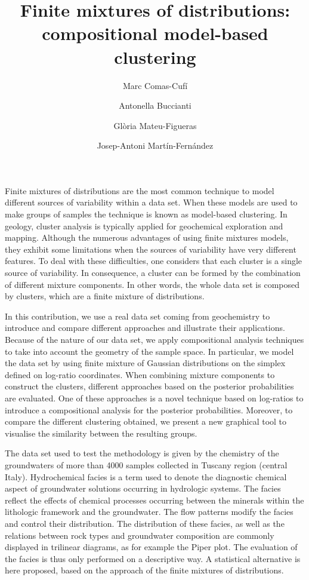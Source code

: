 \documentclass[a4paper,11pt]{article}
\title{Finite mixtures of distributions: compositional model-based clustering}
\author{Marc Comas-Cufí \and Antonella Buccianti \and Glòria Mateu-Figueras \and Josep-Antoni Martín-Fernández}
\begin{document}
\maketitle

Finite mixtures of distributions are the most common technique to model different sources of variability within a data set. When these models are used to make groups of samples the technique is known as  model-based clustering. In geology, cluster analysis is typically applied for geochemical exploration and mapping. Although the numerous advantages of using finite mixtures models, they exhibit some limitations when the sources of variability have very different features. To deal with these difficulties, one considers that each cluster is a single source of variability. In consequence, a cluster can be formed by the combination of different mixture components. In other words, the whole data set is composed by clusters, which are a finite mixture of distributions.

In this contribution, we use a real data set coming from geochemistry to introduce and compare different approaches and illustrate their applications. Because of the nature of our data set, we apply compositional analysis techniques to take into account the geometry of the sample space. In particular, we model the data set by using finite mixture of Gaussian distributions on the simplex defined on log-ratio coordinates. When combining mixture components to construct the clusters, different approaches based on the posterior probabilities are evaluated. One of these approaches is a novel technique based on log-ratios to introduce a compositional analysis for the posterior probabilities. Moreover, to compare the different clustering obtained, we present a new graphical tool to visualise the similarity between the resulting groups. 

The data set used to test the methodology is given by the chemistry of the groundwaters of more than 4000 samples collected in Tuscany region (central Italy). Hydrochemical facies is a term used to denote the diagnostic chemical aspect of groundwater solutions occurring in hydrologic systems. The facies reflect the effects of chemical processes occurring between the minerals within the lithologic framework and the groundwater. The flow patterns modify the facies and control their distribution. The distribution of these facies, as well as the relations between rock types and groundwater composition are commonly displayed in trilinear diagrams, as for example the Piper plot. The evaluation of the facies is thus only performed on a descriptive way. A statistical alternative is here proposed, based on the approach of the finite mixtures of distributions.
\end{document}
